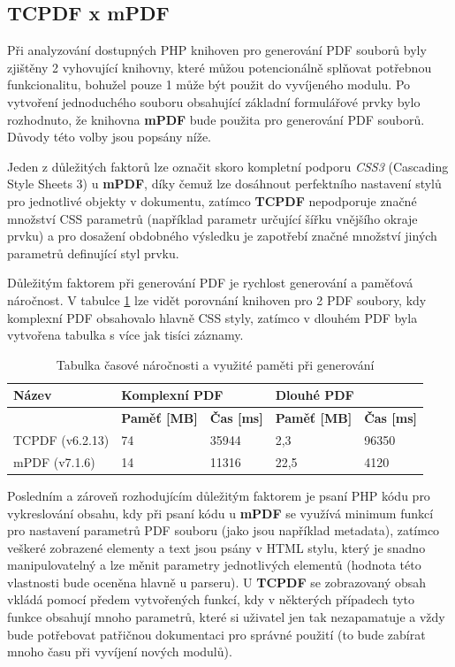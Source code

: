 \subsection{TCPDF x mPDF}
Při analyzování dostupných PHP knihoven pro generování PDF souborů byly zjištěny 2 vyhovující knihovny, které můžou potencionálně splňovat potřebnou funkcionalitu, bohužel pouze 1 může být použit do vyvíjeného modulu. Po vytvoření jednoduchého souboru obsahující základní formulářové prvky bylo rozhodnuto, že knihovna \textbf{mPDF} bude použita pro generování PDF souborů. Důvody této volby jsou popsány níže.
\par
Jeden z důležitých faktorů lze označit skoro kompletní podporu \textit{CSS3} (Cascading Style Sheets 3) u \textbf{mPDF}, díky čemuž lze dosáhnout perfektního nastavení stylů pro jednotlivé objekty v dokumentu, zatímco \textbf{TCPDF} nepodporuje značné množství CSS parametrů (například parametr určující šířku vnějšího okraje prvku) a pro dosažení obdobného výsledku je zapotřebí značné množství jiných parametrů definující styl prvku.
\par
Důležitým faktorem při generování PDF je rychlost generování a paměťová náročnost. V tabulce \ref{tab:table_generators} lze vidět porovnání knihoven pro 2  PDF soubory, kdy komplexní PDF obsahovalo hlavně CSS styly, zatímco v dlouhém PDF byla vytvořena tabulka s více jak tisíci záznamy.
\begin{table}[h!]
\centering
\begin{tabular}{|l|l|l|l|l|} 
\hline
\textbf{Název} & \multicolumn{2}{l|}{\textbf{Komplexní PDF}} & \multicolumn{2}{l|}{\textbf{Dlouhé PDF}}  \\ 
\hline
               & \textbf{Paměť [MB]} & \textbf{Čas [ms]}     & \textbf{Paměť [MB]} & \textbf{Čas [ms]}   \\ 
\hline
TCPDF (v6.2.13)          & 74                  & 35944                 & 2,3                 & 96350               \\ 
\hline
mPDF   (v7.1.6)           & 14                  & 11316                 & 22,5                & 4120                \\
\hline
\end{tabular}
\caption{Tabulka časové náročnosti a využité paměti při generování}
\label{tab:table_generators}
\end{table}
\par
Posledním a zároveň rozhodujícím důležitým faktorem je psaní PHP kódu pro vykreslování obsahu, kdy při psaní kódu u \textbf{mPDF} se využívá minimum funkcí pro nastavení parametrů PDF souboru (jako jsou například metadata), zatímco veškeré zobrazené elementy a text jsou psány v HTML stylu, který je snadno manipulovatelný a lze měnit parametry jednotlivých elementů (hodnota této vlastnosti bude oceněna hlavně u parseru). U \textbf{TCPDF} se zobrazovaný obsah vkládá pomocí předem vytvořených funkcí, kdy v některých případech tyto funkce obsahují mnoho parametrů, které si uživatel jen tak nezapamatuje a vždy bude potřebovat patřičnou dokumentaci pro správné použití (to bude zabírat mnoho času při vyvíjení nových modulů).
